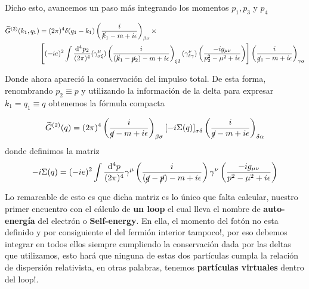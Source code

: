 \documentclass{article}
\numberwithin{equation}{section}
\begin{document}
Dicho esto, avancemos un paso más integrando los momentos $ p_1,p_3 $ y $ p_4 $

\begin{equation}
\begin{aligned}
\widetilde{G}^{(2)}(k_{1},q_{1})&=(2\pi)^{4}\delta(q_{1}-k_{1})\left(\frac{i}{\cancel{k}_{1}-m+i\epsilon}\right)_{\beta\sigma}\times\\
&\left[(-ie)^{2}\int\frac{\mathrm{\mathrm{d^4}p_2}}{(2\pi)^{4}}(\gamma_{\sigma\xi}^{\mu})\left(\frac{i}{(\cancel{k}_{1}-\cancel{p}_2)-m+i\epsilon}\right)_{\xi\delta}(\gamma_{\delta\gamma}^{\nu})\left(\frac{-ig_{\mu\nu}}{p_2^{2}-\mu^{2}+i\epsilon}\right) \right] \left(\frac{i}{\cancel{q}_{1}-m+i\epsilon}\right)_{\gamma\alpha}
\end{aligned}
\end{equation}

Donde ahora apareció la conservación del impulso total. De esta forma,
renombrando $p_2\equiv p$ y utilizando la información de
la delta para expresar $k_{1}=q_{1}\equiv q$ obtenemos la fórmula compacta

\begin{equation}
\widetilde{G}^{(2)}(q)=(2\pi)^{4}\left(\frac{i}{\cancel{q}-m+i\epsilon}\right)_{\beta\sigma} \left[-i\Sigma(q)\right]_{\sigma \delta} \left(\frac{i}{\cancel{q}-m+i\epsilon}\right)_{\delta \alpha}
\end{equation}
donde definimos la matriz
\begin{equation}\label{autoenergiaelectron}
-i\Sigma(q)=(-ie)^{2}\int\frac{\mathrm{d^4}p}{(2\pi)^{4}}\gamma^{\mu}\left(\frac{i}{(\cancel{q}-\cancel{p})-m+i\epsilon}\right)\gamma^{\nu}\left(\frac{-ig_{\mu\nu}}{p^{2}-\mu^{2}+i\epsilon}\right)
\end{equation}

Lo remarcable de esto es que dicha matriz es lo único que falta calcular, nuestro primer encuentro con el cálculo de \textbf{un loop} el cual lleva el nombre de \textbf{auto-energía} del electrón o \textbf{Self-energy}. En ella, el momento del fotón no esta definido y por consiguiente
el del fermión interior tampoco!, por eso debemos integrar en todos
ellos siempre cumpliendo la conservación dada por las deltas que utilizamos,
esto hará que ninguna de estas dos partículas cumpla la relación de
dispersión relativista, en otras palabras, tenemos \textbf{partículas
virtuales} dentro del loop!.
\end{document}
